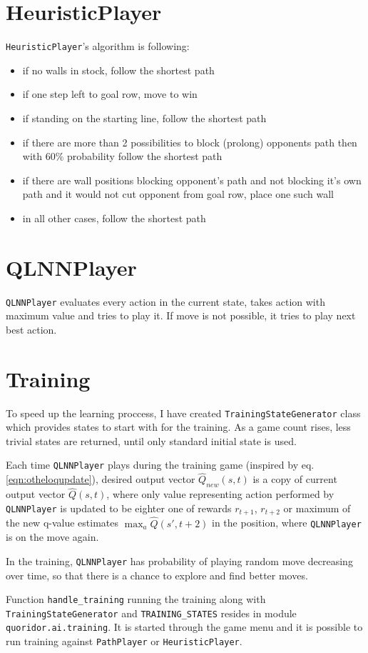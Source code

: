 \section{HeuristicPlayer}
{\lstinline{HeuristicPlayer}}'s algorithm is following:
\begin{itemize}
  \vspace*{-0.25cm}
  \setlength\itemsep{-0.15cm}

  \item if no walls in stock, follow the shortest path
  \item if one step left to goal row, move to win
  \item if standing on the starting line, follow the shortest path
  \item if there are more than 2 possibilities to block (prolong) opponents
        path then with $60\%$ probability follow the shortest path
  \item if there are wall positions blocking opponent's path and not
        blocking it's own path and it would not cut opponent from goal row,
        place one such wall
  \item in all other cases, follow the shortest path

  \vspace*{-0.25cm}
\end{itemize}

\section{QLNNPlayer}
{\lstinline{QLNNPlayer}} evaluates every action in the current state, takes action
with maximum value and tries to play it. If move is not possible, it tries to
play next best action.

\section{Training}
To speed up the learning proccess, I have created
{\lstinline{TrainingStateGenerator}} class which provides states
to start with for the training. As a game count rises, less trivial states are
returned, until only standard initial state is used.

Each time {\lstinline{QLNNPlayer}} plays during the training game (inspired
by eq. \ref{eqn:otheloqupdate}), desired output vector $\hat{Q}_{new}(s, t)$
is a copy of current output vector $\hat{Q}(s, t)$,
where only value representing action performed by {\lstinline{QLNNPlayer}}
is updated to be eighter one of rewards $r_{t+1}$, $r_{t+2}$ or maximum of
the new q-value estimates $\displaystyle{\max_a}\hat{Q}(s', t{+}2)$
in the position, where {\lstinline{QLNNPlayer}} is on the move again.

In the training, {\lstinline{QLNNPlayer}} has probability of
playing random move decreasing over time, so that there is a chance to explore
and find better moves.

Function {\lstinline{handle_training}} running the training along with
{\lstinline{TrainingStateGenerator}} and {\lstinline{TRAINING_STATES}}
resides in module {\lstinline{quoridor.ai.training}}. It is started through
the game menu and it is possible to run training against
{\lstinline{PathPlayer}} or {\lstinline{HeuristicPlayer}}.
